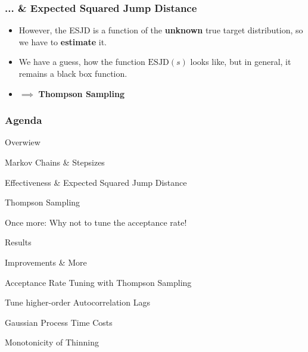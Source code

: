 \begin{frame}[c]
    \frametitle{... \& Expected Squared Jump Distance}
    \begin{itemize}
        \item However, the ESJD is a function of the \textbf{unknown} true target distribution, so we have to \textbf{estimate} it.
        \item We have a guess, how the function $\mathrm{ESJD}(s)$ looks like, but in general, it remains a black box function.
        \item[] $\implies$ \textbf{Thompson Sampling}
    \end{itemize}
\end{frame}

\begin{frame}[c]
    \frametitle{Agenda}
    \begin{itemize}
        \item Overwiew
        \begin{itemize}
            {\color{lgray}
            \item Markov Chains \& Stepsizes
            \item Effectiveness \& Expected Squared Jump Distance 
            }
            \item Thompson Sampling
            {\color{lgray}
            \item Once more: Why not to tune the acceptance rate!
            }
        \end{itemize}
        {\color{lgray}
        \item Results
        \item Improvements \& More
        }
        \begin{itemize}
            {\color{lgray}
            \item Acceptance Rate Tuning with Thompson Sampling
            \item Tune higher-order Autocorrelation Lags
            \item Gaussian Process Time Costs
            \item Monotonicity of Thinning
        }
        \end{itemize}
    \end{itemize}
\end{frame}

